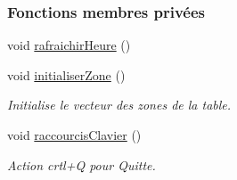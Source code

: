 \subsubsection*{Fonctions membres privées}
\begin{DoxyCompactItemize}
\item 
void \hyperlink{class_ttpa_ihm_a3b0d10b212527273c03fa8e37543d037}{rafraichir\+Heure} ()
\item 
void \hyperlink{class_ttpa_ihm_a5d180e581060b01e028f44ee7bd25290}{initialiser\+Zone} ()
\begin{DoxyCompactList}\small\item\em Initialise le vecteur des zones de la table. \end{DoxyCompactList}\item 
void \hyperlink{class_ttpa_ihm_a9d649ace50425bdc2bea311753b4214c}{raccourcis\+Clavier} ()
\begin{DoxyCompactList}\small\item\em Action crtl+Q pour Quitte. \end{DoxyCompactList}\end{DoxyCompactItemize}

